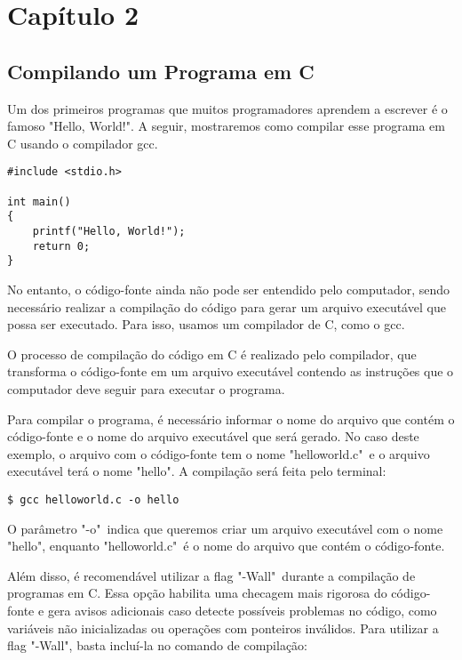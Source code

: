 \chapter{Capítulo 2}

\section{Compilando um Programa em C}

Um dos primeiros programas que muitos programadores aprendem a escrever é o famoso "Hello, World!". A seguir, mostraremos como compilar esse programa em C usando o compilador gcc.

\begin{scriptsize}
\estiloC
\begin{lstlisting}[title=helloworld.c]
#include <stdio.h>

int main()
{
    printf("Hello, World!");
    return 0;
}
\end{lstlisting}
\end{scriptsize}

No entanto, o código-fonte ainda não pode ser entendido pelo computador, sendo necessário realizar a compilação do código para gerar um arquivo executável que possa ser executado. Para isso, usamos um compilador de C, como o gcc.

O processo de compilação do código em C é realizado pelo compilador, que transforma o código-fonte em um arquivo executável contendo as instruções que o computador deve seguir para executar o programa.

Para compilar o programa, é necessário informar o nome do arquivo que contém o código-fonte e o nome do arquivo executável que será gerado. No caso deste exemplo, o arquivo com o código-fonte tem o nome "helloworld.c"\ e o arquivo executável terá o nome "hello". A compilação será feita pelo terminal:

\begin{scriptsize}
\estilobash
\begin{lstlisting}
$ gcc helloworld.c -o hello
\end{lstlisting}
\end{scriptsize}

O parâmetro "-o"\ indica que queremos criar um arquivo executável com o nome "hello", enquanto "helloworld.c"\ é o nome do arquivo que contém o código-fonte.

Além disso, é recomendável utilizar a flag "-Wall"\ durante a compilação de programas em C. Essa opção habilita uma checagem mais rigorosa do código-fonte e gera avisos adicionais caso detecte possíveis problemas no código, como variáveis não inicializadas ou operações com ponteiros inválidos. Para utilizar a flag "-Wall", basta incluí-la no comando de compilação:

